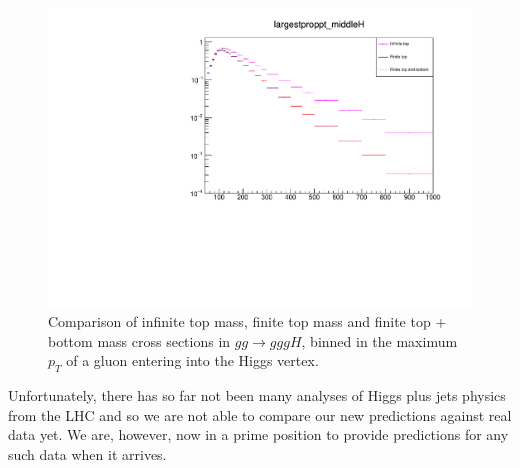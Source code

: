 \begin{figure}[t]
\centering
\includegraphics[scale=0.72]{Images/largestproppt.pdf}
\caption{Comparison of infinite top mass, finite top mass and finite top + bottom mass cross sections in $gg \to gggH$, binned in the maximum $p_T$ of a gluon entering into the Higgs vertex. }
\label{fig:maxprop}
\end{figure}

Unfortunately, there has so far not been many analyses of Higgs plus jets physics from the LHC and so we are not able to compare our new predictions against real data yet. We are, however, now in a prime position to provide predictions for any such data when it arrives. 


